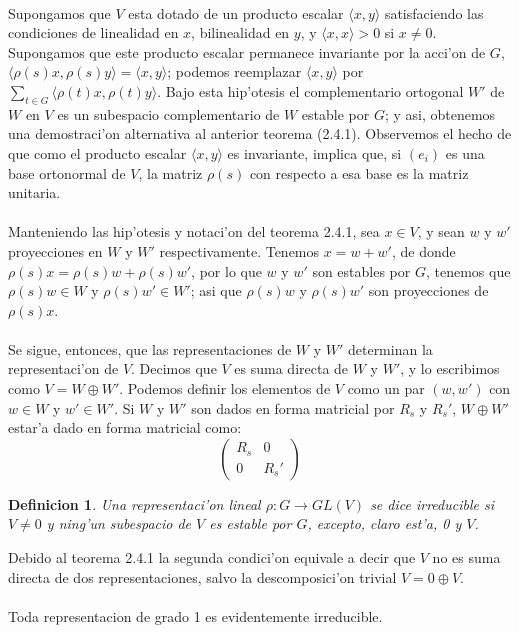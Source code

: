 \documentclass[a4paper,openright,12pt]{book}
\numberwithin{equation}{section} %
\newtheorem{definicion}{Definicion}[section] %
\begin{document}
\\
Supongamos que $V$ esta dotado de un producto escalar $\langle x,y \rangle$ satisfaciendo las condiciones de linealidad en $x$, bilinealidad en $y$, y $\langle x,x \rangle > 0$ si $x \neq 0$. Supongamos que este producto escalar permanece invariante por la acci'on de $G$, $\langle \rho(s)x,\rho (s)y \rangle =\langle x,y \rangle$; podemos reemplazar $\langle x,y \rangle$ por $\sum_{t \in G} \langle \rho(t)x,\rho (t)y \rangle$. Bajo esta hip'otesis el complementario ortogonal $W'$ de $W$ en $V$ es un subespacio complementario de $W$ estable por $G$; y asi, obtenemos una demostraci'on alternativa al anterior teorema (2.4.1). Observemos el hecho de que como el producto escalar $\langle x,y \rangle$ es invariante, implica que, si $(e_{i})$ es una base ortonormal de $V$, la matriz $\rho (s)$ con respecto a esa base es la matriz unitaria.\\
\\
Manteniendo las hip'otesis y notaci'on del teorema 2.4.1, sea $x \in V$, y sean $w$ y $w'$ proyecciones en $W$ y $W'$ respectivamente. Tenemos $x=w+w'$, de donde $\rho (s)x=\rho (s)w+\rho (s)w'$, por lo que $w$ y $w'$ son estables por $G$, tenemos que $\rho (s)w \in W$ y $\rho (s)w' \in W'$; asi que $\rho (s)w$ y $\rho (s)w'$ son proyecciones de $\rho (s)x$.\\
\\
Se sigue, entonces, que las representaciones de $W$ y $W'$ determinan la representaci'on de $V$. Decimos que $V$ es suma directa de $W$ y $W'$, y lo escribimos como $V=W \oplus W'$. Podemos definir los elementos de $V$ como un par $(w,w')$ con $w \in W$ y $w' \in W'$. Si $W$ y $W'$ son dados en forma matricial por $R_{s}$ y $R_{s}'$, $W \oplus W'$ estar'a dado en forma matricial como:
\[
\left(
\begin{array}{cc}
R_{s} & 0 \\
0 & R_{s}'
\end{array}
\right)
\]
\begin{definicion}
Una representaci'on lineal $\rho : G \rightarrow GL(V)$ se dice \textit{irreducible} si $V \neq 0$ y ning'un subespacio de $V$ es estable por $G$, excepto, claro est'a, 0 y $V$. 
\end{definicion}
Debido al teorema 2.4.1 la segunda condici'on equivale a decir que $V$ no es suma directa de dos representaciones, salvo la descomposici'on trivial $V=0\oplus V$.\\
\\
Toda representacion de grado 1 es evidentemente irreducible.
\end{document}
